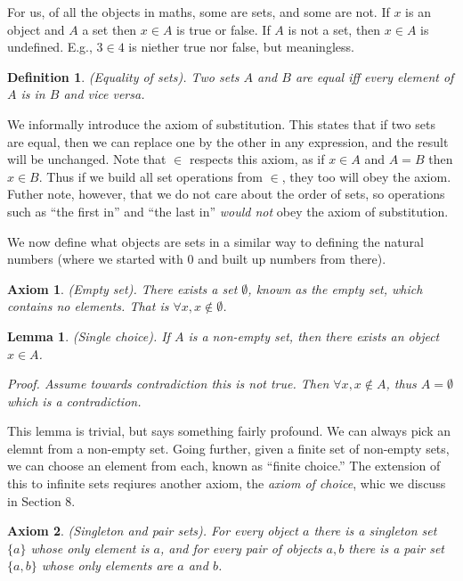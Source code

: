 \documentclass{article}
\newtheorem{definition}{Definition}[subsection]
\newtheorem{axiom}{Axiom}[section]
\newtheorem{lemma}{Lemma}[subsection]
\let\it\textit
\begin{document}
For us, of all the objects in maths, some are sets, and some are not. If
$x$ is an object and $A$ a set then $x \in A$ is true or false. 
If $A$ is not a set, then $x \in A$ is undefined. E.g., $3\in 4$ 
is niether true nor false, but meaningless.

\begin{definition}
	(Equality of sets). Two sets $A$ and $B$ are equal iff every 
	element of $A$ is in $B$ and vice versa.
\end{definition}

We informally introduce the axiom of substitution. This states 
that if two sets are equal, then we can replace one by the other 
in any expression, and the result will be unchanged. Note  that 
$\in$ respects this axiom, as if $x \in A$ and $A=B$ then $x \in B$. 
Thus if we build all set operations from $\in$, they too will obey 
the axiom. Futher note, however, that we do not care about the 
order of sets, so operations such as ``the first in'' and ``the last in''
\it{would not} obey the axiom of substitution.

We now define what objects are sets in a similar way to defining the natural 
numbers (where we started with $0$ and built up numbers from there).

\begin{axiom}
	(Empty set). There exists a set $\emptyset$, known as the empty 
	set, which contains no elements. That is $\forall x, x \not \in \emptyset$.
\end{axiom}

\begin{lemma}
	(Single choice). If $A$ is a non-empty set, then there exists 
	an object $x \in A$. 

	Proof. Assume towards contradiction this is not true. Then 
	$\forall x, x \not \in A$, thus $A = \emptyset$ which is a 
	contradiction.
\end{lemma}

This lemma is trivial, but says something fairly profound. We can 
always pick an elemnt from a non-empty set. Going further, given 
a finite set of non-empty sets, we can choose an element from each, 
known as ``finite choice.'' The extension of this to infinite sets 
reqiures another axiom, the \it{axiom of choice}, whic we discuss 
in Section 8.

\begin{axiom}
	(Singleton and pair sets). For every object $a$ there is 
	a singleton set $\{a\}$ whose only element is $a$, and for
	every pair of objects $a,b$ there is a pair set $\{a,b\}$
	whose only elements are $a$ and $b$.
\end{axiom}
\end{document}
